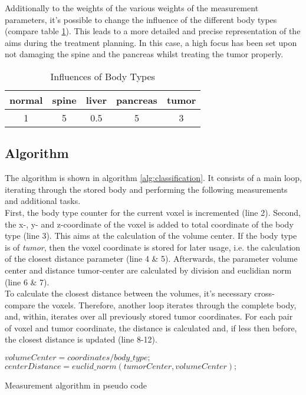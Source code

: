Additionally to the weights of the various weights of the measurement parameters, it's possible to change the influence of the different body types (compare table \ref{tbl:classification_type_weights}). This leads to a more detailed and precise representation of the aims during the treatment planning. In this case, a high focus has been set upon not damaging the spine and the pancreas whilst treating the tumor properly. 

\begin{table}
\centering
\caption{Influences of Body Types}
\begin{tabular}[htbp]{c | c | c | c | c}
\textbf{normal} & \textbf{spine} & \textbf{liver} & \textbf{pancreas} & \textbf{tumor} \\ \hline
1 & 5 & 0.5 & 5 & 3
\end{tabular}
\label{tbl:classification_type_weights}
\end{table}

\subsection{Algorithm}\label{classification:algorithm}
The algorithm is shown in algorithm \ref{alg:classification}. It consists of a main loop, iterating through the stored body and performing the following measurements and additional tasks. \\
First, the body type counter for the current voxel is incremented (line 2). Second, the x-, y- and z-coordinate of the voxel is added to total coordinate of the body type (line 3). This aims at the calculation of the volume center. If the body type is of \textit{tumor}, then the voxel coordinate is stored for later usage, i.e. the calculation of the closest distance parameter (line 4 \& 5). Afterwards, the parameter volume center and distance tumor-center are calculated by division and euclidian norm (line 6 \& 7).\\
To calculate the closest distance between the volumes, it's necessary cross-compare the voxels. Therefore, another loop iterates through the complete body, and, within, iterates over all previously stored tumor coordinates. For each pair of voxel and tumor coordinate, the distance is calculated and, if less then before, the closest distance is updated (line 8-12).

\begin{algorithm}
$volumeCenter = coordinates / body\_type;$ \\
$centerDistance = euclid\_norm (tumorCenter, volumeCenter);$ \\
\caption{Measurement algorithm in pseudo code}
\label{alg:classification}
\end{algorithm}

